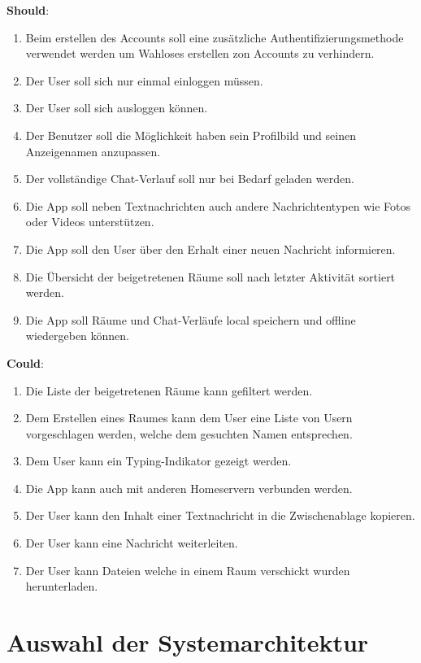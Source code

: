     \textbf{Should}:
    \begin{enumerate}[label={\roman*.}, leftmargin=2.5cm]
        \item Beim erstellen des Accounts soll eine zusätzliche Authentifizierungsmethode verwendet werden um Wahloses erstellen zon Accounts zu verhindern.
        \item Der User soll sich nur einmal einloggen müssen.
        \item Der User soll sich ausloggen können.
        \item Der Benutzer soll die Möglichkeit haben sein Profilbild und seinen Anzeigenamen anzupassen.
        \item Der vollständige Chat-Verlauf soll nur bei Bedarf geladen werden.
        \item Die App soll neben Textnachrichten auch andere Nachrichtentypen wie Fotos oder Videos unterstützen.
        \item Die App soll den User über den Erhalt einer neuen Nachricht informieren.
        \item Die Übersicht der beigetretenen Räume soll nach letzter Aktivität sortiert werden.
        \item Die App soll Räume und Chat-Verläufe local speichern und offline wiedergeben können.
    \end{enumerate}


    \textbf{Could}:
    \begin{enumerate}[label={\roman*.}, leftmargin=2.5cm]
        \item Die Liste der beigetretenen Räume kann gefiltert werden.
        \item Dem Erstellen eines Raumes kann dem User eine Liste von Usern vorgeschlagen werden, welche dem gesuchten Namen entsprechen.
        \item Dem User kann ein Typing-Indikator gezeigt werden.
        \item Die App kann auch mit anderen Homeservern verbunden werden.
        \item Der User kann den Inhalt einer Textnachricht in die Zwischenablage kopieren.
        \item Der User kann eine Nachricht weiterleiten.
        \item Der User kann Dateien welche in einem Raum verschickt wurden herunterladen.
    \end{enumerate}


    \section{Auswahl der Systemarchitektur}\label{sec:auswahl-der-systemarchitektur}

